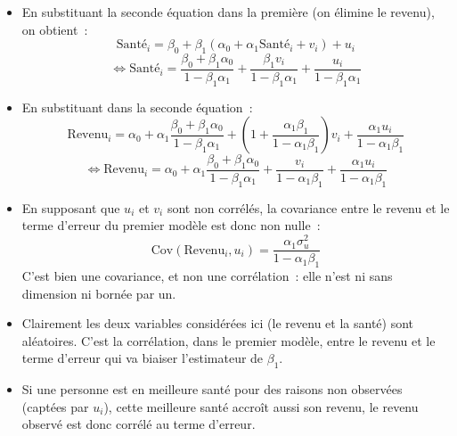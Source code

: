 \documentclass[10pt]{beamer}
\begin{document}
\begin{notes}

  \begin{itemize}

  \item En substituant la seconde équation dans la première (on élimine le
    revenu), on obtient~:
    \[
      \text{Santé}_i = \beta_0 + \beta_1\left( \alpha_0+\alpha_1\text{Santé}_i+v_i\right)+u_i
    \]
    \[
      \Leftrightarrow \text{Santé}_i = \frac{\beta_0+\beta_1\alpha_0}{1-\beta_1\alpha_1} + \frac{\beta_1 v_i}{1-\beta_1\alpha_1} + \frac{u_i}{1-\beta_1\alpha_1}
    \]
  \item En substituant dans la seconde équation~:
    \[
      \text{Revenu}_i = \alpha_0 + \alpha_1\frac{\beta_0+\beta_1\alpha_0}{1-\beta_1\alpha_1} + \left( 1 + \frac{\alpha_1\beta_1}{1-\alpha_1\beta_1}\right)v_i  + \frac{\alpha_1u_i}{1-\alpha_1\beta_1}
    \]
    \[
      \Leftrightarrow\text{Revenu}_i = \alpha_0 + \alpha_1\frac{\beta_0+\beta_1\alpha_0}{1-\beta_1\alpha_1}  + \frac{v_i}{1-\alpha_1\beta_1}  + \frac{\alpha_1u_i}{1-\alpha_1\beta_1}
    \]

  \item En supposant que $u_i$ et $v_i$ sont non corrélés, la covariance entre le
    revenu et le terme d'erreur du premier modèle est donc non nulle~:
    \[
      \mathrm{Cov}\left( \text{Revenu}_i, u_i \right) = \frac{\alpha_1\sigma_u^2}{1-\alpha_1\beta_1}
    \]
    C'est bien une covariance, et non une corrélation~: elle n'est ni sans
    dimension ni bornée par un.\newline

  \item Clairement les deux variables considérées ici (le revenu et la santé)
    sont aléatoires. C'est la corrélation, dans le premier modèle, entre le
    revenu et le terme d'erreur qui va biaiser l'estimateur de $\beta_1$.\newline

  \item Si une personne est en meilleure santé pour des raisons non observées
    (captées par $u_i$), cette meilleure santé accroît aussi son revenu, le
    revenu observé est donc corrélé au terme d'erreur.

  \end{itemize}

\end{notes}
\end{document}
